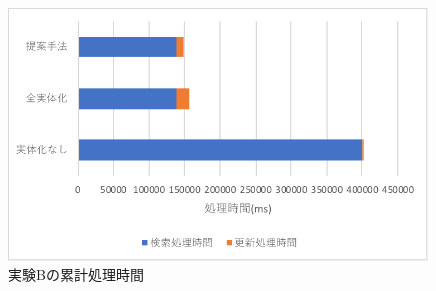 \documentclass[a4paper,11pt]{ujreport}
\begin{document}
\begin{figure}[htbp]
	\begin{center}
		\includegraphics[width=30em]{src/ExperimentB-total.pdf} %
	\end{center}
	\caption{実験Bの累計処理時間}
	\label{figure:ExperimentB-total}
\end{figure}
\end{document}
